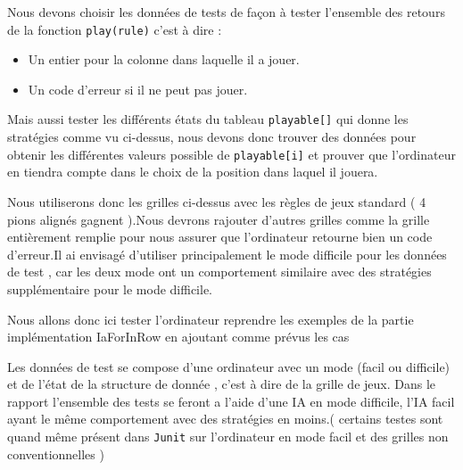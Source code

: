 


 Nous devons choisir les données de tests de façon à tester l'ensemble des retours de la fonction \texttt{play(rule)}
c'est à dire :
\begin{itemize}
 \item Un entier pour la colonne dans laquelle il a jouer.
 \item Un code d'erreur si il ne peut pas jouer.
\end{itemize}

Mais aussi tester les différents états du tableau \texttt{playable[]} qui donne les stratégies comme vu ci-dessus, nous devons donc trouver des données pour obtenir les différentes valeurs possible de \texttt{playable[i]} et prouver que l'ordinateur en tiendra compte dans le choix de la position dans laquel il jouera.

Nous utiliserons donc les grilles ci-dessus avec les règles de jeux standard ( 4 pions alignés gagnent ).Nous devrons rajouter d'autres grilles comme la grille entièrement remplie pour nous assurer que l'ordinateur retourne bien un code d'erreur.Il ai envisagé d'utiliser principalement le mode difficile pour les données de test , car les deux mode ont un comportement similaire avec des stratégies supplémentaire pour le mode difficile.


Nous allons donc ici tester l'ordinateur reprendre les exemples de la partie implémentation IaForInRow en ajoutant comme prévus les cas 

Les données de test se compose d'une ordinateur avec un mode (facil ou difficile) et de l'état de la structure de donnée , c'est à dire de la grille de jeux. Dans le rapport l'ensemble des tests se feront a l'aide d'une IA en mode difficile, l'IA facil ayant le même comportement avec des stratégies en moins.( certains testes sont quand même présent dans \texttt{Junit} sur l'ordinateur en mode facil et des grilles non conventionnelles )

